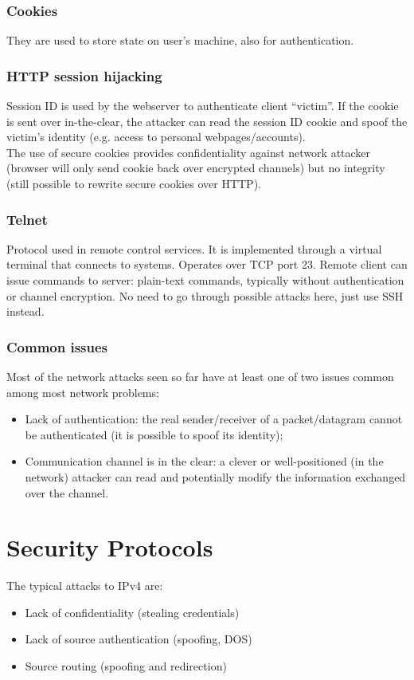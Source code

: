 \documentclass[a4paper, 10pt, titlepage]{article}
\begin{document}
\subsubsection*{Cookies}
They are used to store state on user’s machine, also for authentication.

\subsubsection{HTTP session hijacking}
Session ID is used by the webserver to authenticate client “victim”. If the cookie is sent over in-the-clear, the attacker can read the session ID cookie and spoof the victim’s identity (e.g. access to personal webpages/accounts). \medskip\\
The use of secure cookies provides confidentiality against network attacker (browser will only send cookie back over encrypted channels) but no integrity (still possible to rewrite secure cookies over HTTP).

\subsubsection{Telnet}
Protocol used in remote control services. It is implemented through a virtual terminal that connects to systems. Operates over TCP port 23. Remote client can issue commands to server: plain-text commands, typically without authentication or channel encryption. No need to go through possible attacks here, just use SSH instead.

\subsubsection{Common issues}
Most of the network attacks seen so far have at least one of two issues common among most network problems:
\begin{itemize}
	\item Lack of authentication: the real sender/receiver of a packet/datagram cannot be authenticated (it is possible to spoof its identity);
	\item Communication channel is in the clear: a clever or well-positioned (in the network) attacker can read and 	potentially modify the information exchanged over the 	channel.
\end{itemize}

\newpage
\section{Security Protocols}
The typical attacks to IPv4 are:
\begin{itemize}
	\item Lack of confidentiality (stealing credentials)
	\item Lack of source authentication (spoofing, DOS)
	\item Source routing (spoofing and redirection)
\end{itemize}
\end{document}
